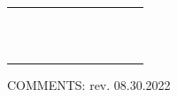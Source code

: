\documentclass{sop_class}[overrideChapters] %
\begin{document}
{\begin{landscape}
\begin{table}[!htbp]
\begin{threeparttable}
\begin{tabular}{|c|c|c|c|c|c|c|c|c|c|c|}
            \hline
            {} & {} & {} & {} & {} & {} & {} & {} & {} & {} & {}\\
            \hline
            {} & {} & {} & {} & {} & {} & {} & {} & {} & {} & {}\\
            \hline
            {} & {} & {} & {} & {} & {} & {} & {} & {} & {} & {}\\
            \hline
            {} & {} & {} & {} & {} & {} & {} & {} & {} & {} & {}\\
            \hline
            {} & {} & {} & {} & {} & {} & {} & {} & {} & {} & {}\\
            \hline
            {} & {} & {} & {} & {} & {} & {} & {} & {} & {} & {}\\
            \hline
            {} & {} & {} & {} & {} & {} & {} & {} & {} & {} & {}\\
            \hline
            {} & {} & {} & {} & {} & {} & {} & {} & {} & {} & {}\\
            \hline
            {} & {} & {} & {} & {} & {} & {} & {} & {} & {} & {}\\
            \hline
            {} & {} & {} & {} & {} & {} & {} & {} & {} & {} & {}\\
            \hline
            {} & {} & {} & {} & {} & {} & {} & {} & {} & {} & {}\\
            \hline
            {} & {} & {} & {} & {} & {} & {} & {} & {} & {} & {}\\
            \hline
            {} & {} & {} & {} & {} & {} & {} & {} & {} & {} & {}\\
            \hline
            \bottomrule
            \end{tabular}
        \begin{tablenotes}
            \small
            \item COMMENTS: \hfill{} rev. 08.30.2022 \\
        \end{tablenotes}
    \end{threeparttable}
\end{table}
 \end{landscape}
\clearpage
\newpage
\begin{landscape} %

\end{landscape}}
\end{document}
